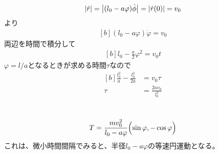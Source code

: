 \documentclass[../ap_2012.tex]{subfiles}
\begin{document}
\section{}
\begin{equation}\begin{aligned}[b]
    \abs{\dot{r}}=\abs{(l_0-a\varphi)\dot{\phi}} = \abs{\dot{r}(0)}=v_0
\end{aligned}\end{equation}
より
\begin{equation}\begin{aligned}[b]
    (l_0-a\varphi)\dot{\varphi} = v_0
\end{aligned}\end{equation}
両辺を時間で積分して
\begin{equation}\begin{aligned}[b]
    l_0-\frac{a}{2}\varphi^2 = v_0t
\end{aligned}\end{equation}
\(\varphi=l/a\)となるときが求める時間\(\tau\)なので
\begin{equation}\begin{aligned}[b]
    \frac{l_0^2}{a}-\frac{l_0^2}{2a}&=v_0\tau\\
    \tau &= \frac{2a v_0}{l_0^2}
\end{aligned}\end{equation}

\section{}
\begin{equation}\begin{aligned}[b]
    T = \frac{mv_0^2}{l_0-a\varphi}\Bigl(\sin\varphi, -\cos\varphi\Bigr)
\end{aligned}\end{equation}
これは、微小時間間隔でみると、半径\(l_0-a\varphi\)の等速円運動となる。
\end{document}

